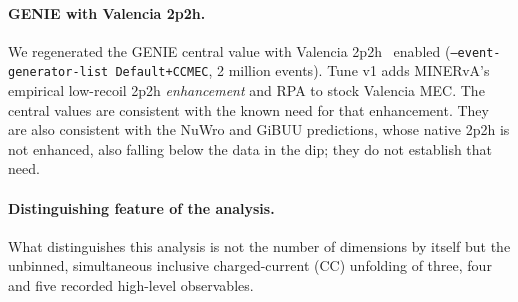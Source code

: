 \paragraph{GENIE with Valencia 2p2h.} We regenerated the GENIE central value with Valencia 2p2h~\cite{Nieves:2011pp,Gran:2013kda} enabled (\texttt{--event-generator-list Default+CCMEC}, 2 million events). Tune v1 adds MINERvA's empirical low-recoil 2p2h \emph{enhancement} and RPA to stock Valencia MEC. The central values are consistent with the known need for that enhancement. They are also consistent with the NuWro and GiBUU predictions, whose native 2p2h is not enhanced, also falling below the data in the dip; they do not establish that need.

\paragraph{Distinguishing feature of the analysis.} What distinguishes this analysis is not the number of dimensions by itself but the unbinned, simultaneous inclusive charged-current (CC) unfolding of three, four and five recorded high-level observables.

